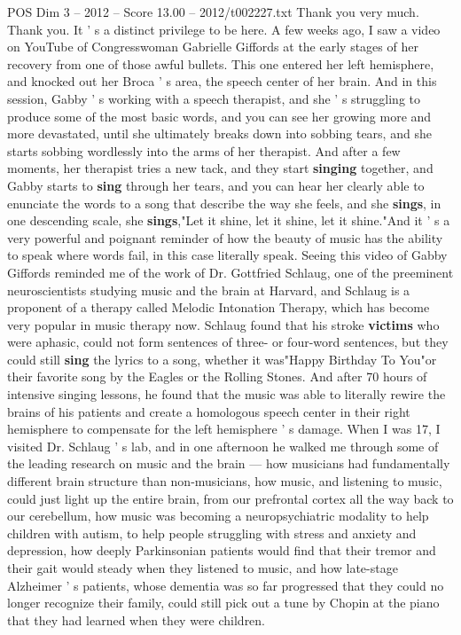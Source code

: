 \begin{textsample}{POS Dim 3 – 2012 – Score 13.00 – 2012/t002227.txt}  \label{ex:f3_pos_045}
Thank you very much.
Thank you.
It ' s a distinct privilege to be here.
A few weeks ago, I saw a video on YouTube of Congresswoman Gabrielle Giffords at the early stages of her recovery from one of those awful bullets.
This one entered her left hemisphere, and knocked out her Broca ' s area, the speech center of her brain.
And in this session, Gabby ' s working with a speech therapist, and she ' s struggling to produce some of the most basic words, and you can see her growing more and more devastated, until she ultimately breaks down into sobbing tears, and she starts sobbing wordlessly into the arms of her therapist.
And after a few moments, her therapist tries a new tack, and they start \textbf{singing} together, and Gabby starts to \textbf{sing} through her tears, and you can hear her clearly able to enunciate the words to a song that describe the way she feels, and she \textbf{sings}, in one descending scale, she \textbf{sings},"Let it shine, let it shine, let it shine."And it ' s a very powerful and poignant reminder of how the beauty of music has the ability to speak where words fail, in this case literally speak.
Seeing this video of Gabby Giffords reminded me of the work of Dr.
Gottfried Schlaug, one of the preeminent neuroscientists studying music and the brain at Harvard, and Schlaug is a proponent of a therapy called Melodic Intonation Therapy, which has become very popular in music therapy now.
Schlaug found that his stroke \textbf{victims} who were aphasic, could not form sentences of three- or four-word sentences, but they could still \textbf{sing} the lyrics to a song, whether it was"Happy Birthday To You"or their favorite song by the Eagles or the Rolling Stones.
And after 70 hours of intensive singing lessons, he found that the music was able to literally rewire the brains of his patients and create a homologous speech center in their right hemisphere to compensate for the left hemisphere ' s damage.
When I was 17, I visited Dr.
Schlaug ' s lab, and in one afternoon he walked me through some of the leading research on music and the brain — how musicians had fundamentally different brain structure than non-musicians, how music, and listening to music, could just light up the entire brain, from our prefrontal cortex all the way back to our cerebellum, how music was becoming a neuropsychiatric modality to help children with autism, to help people struggling with stress and anxiety and depression, how deeply Parkinsonian patients would find that their tremor and their gait would steady when they listened to music, and how late-stage Alzheimer ' s patients, whose dementia was so far progressed that they could no longer recognize their family, could still pick out a tune by Chopin at the piano that they had learned when they were children.

\end{textsample}
